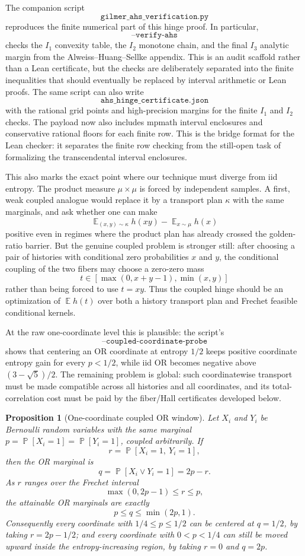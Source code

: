\documentclass[11pt]{article}
\newtheorem{proposition}{Proposition}
\DeclareMathOperator{\E}{\mathbb{E}}
\DeclareMathOperator{\Prb}{\mathbb{P}}
\begin{document}
The companion script
\[
  \texttt{gilmer\_ahs\_verification.py}
\]
reproduces the finite numerical part of this hinge proof.  In particular,
\[
  \texttt{--verify-ahs}
\]
checks the $I_1$ convexity table, the $I_2$ monotone chain, and the final
$I_3$ analytic margin from the Alweiss--Huang--Sellke appendix.  This is an
audit scaffold rather than a Lean certificate, but the checks are deliberately
separated into the finite inequalities that should eventually be replaced by
interval arithmetic or Lean proofs.
The same script can also write
\[
  \texttt{ahs\_hinge\_certificate.json}
\]
with the rational grid points and high-precision margins for the finite
$I_1$ and $I_2$ checks.  The payload now also includes mpmath interval
enclosures and conservative rational floors for each finite row.  This is the
bridge format for the Lean checker: it separates the finite row checking from
the still-open task of formalizing the transcendental interval enclosures.

This also marks the exact point where our technique must diverge from iid
entropy.  The product measure $\mu\times\mu$ is forced by independent samples.
A first, weak coupled analogue would replace it by a transport plan $\kappa$
with the same marginals, and ask whether one can make
\[
  \E_{(x,y)\sim\kappa}h(xy)-\E_{x\sim\mu}h(x)
\]
positive even in regimes where the product plan has already crossed the
golden-ratio barrier.  But the genuine coupled problem is stronger still:
after choosing a pair of histories with conditional zero probabilities
$x$ and $y$, the conditional coupling of the two fibers may choose a
zero-zero mass
\[
  t\in[\max(0,x+y-1),\min(x,y)]
\]
rather than being forced to use $t=xy$.  Thus the coupled hinge should be an
optimization of $\E h(t)$ over both a history transport plan and Frechet
feasible conditional kernels.

At the raw one-coordinate level this is plausible:
the script's
\[
  \texttt{--coupled-coordinate-probe}
\]
shows that centering an OR coordinate at entropy $1/2$ keeps positive
coordinate entropy gain for every $p<1/2$, while iid OR becomes negative
above $(3-\sqrt5)/2$.  The remaining problem is global: such coordinatewise
transport must be made compatible across all histories and all coordinates,
and its total-correlation cost must be paid by the fiber/Hall certificates
developed below.

\begin{proposition}[One-coordinate coupled OR window]
Let $X_i$ and $Y_i$ be Bernoulli random variables with the same marginal
$p=\Prb[X_i=1]=\Prb[Y_i=1]$, coupled arbitrarily.  If
\[
  r=\Prb[X_i=1,\ Y_i=1],
\]
then the OR marginal is
\[
  q=\Prb[X_i\vee Y_i=1]=2p-r.
\]
As $r$ ranges over the Frechet interval
\[
  \max(0,2p-1)\le r\le p,
\]
the attainable OR marginals are exactly
\[
  p\le q\le \min(2p,1).
\]
Consequently every coordinate with $1/4\le p\le 1/2$ can be centered at
$q=1/2$, by taking $r=2p-1/2$; and every coordinate with $0<p<1/4$ can still
be moved upward inside the entropy-increasing region, by taking $r=0$ and
$q=2p$.
\end{proposition}
\end{document}
